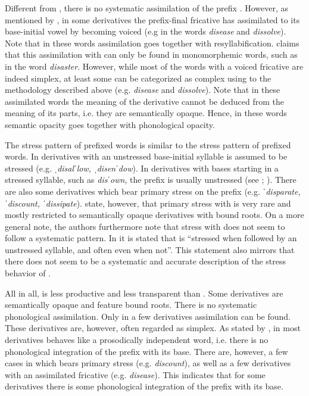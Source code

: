 Different from , there is no systematic assimilation of the prefix . However, as mentioned by \citet[480]{Jespersen.1965}, in some derivatives the prefix-final fricative has assimilated to its base-initial vowel by becoming voiced (e.g in the words \textit{disease} and \textit{dissolve}). Note that in these words assimilation goes together with resyllabification. \citet[158]{Marchand.1969} claims that this assimilation with  can only be found in monomorphemic words, such as in the word \textit{disaster}. However, while most of the words with a voiced fricative are indeed simplex, at least some can be categorized as complex using to the methodology described above (e.g. \textit{disease} and \textit{dissolve}). Note that in these assimilated words the meaning of the derivative cannot be deduced from the meaning of its parts, i.e. they are semantically opaque. Hence, in these words semantic opacity goes together with phonological opacity.

The stress pattern of prefixed words is similar to the stress pattern of  prefixed words. In derivatives with an unstressed base-initial syllable  is assumed to be stressed (e.g. \textit{ˌdisalˈlow, ˌdisenˈdow}). In derivatives with bases starting in a stressed syllable, such as \textit{disˈown}, the prefix is usually unstressed (see \citealt[479 f]{Jespersen.1965}; \citealt[183]{Bauer.2013}). There are also some derivatives which bear primary stress on the prefix (e.g. \textit{ˈdisparate, ˈdiscount, ˈdissipate}). 
\citet[183, 360]{Bauer.2013} state, however, that primary stress with  is very rare and mostly restricted to semantically opaque derivatives with bound roots. On a more general note, the authors furthermore note that stress with  does not seem to follow a systematic pattern. In \citet[223]{Wells.2008} it is stated that  is  ``stressed when followed by an unstressed syllable, and often even when not''. This statement also mirrors that there does not seem to be a systematic and accurate description of the stress behavior of .


All in all,  is less productive and less transparent than . Some derivatives are semantically opaque and feature bound roots.  There is no systematic phonological assimilation. Only in a few derivatives assimilation can be found. These derivatives are, however, often regarded as simplex. As stated by \citet[440]{Bauer.2013}, in most derivatives  behaves like a prosodically independent word, i.e. there is no phonological integration of the prefix with its base. There are, however, a few cases in which  bears primary stress (e.g. \textit{discount}), as well as a few derivatives with an assimilated fricative (e.g. \textit{disease}). This indicates that for some derivatives there is some phonological integration of the prefix with its base.\\

